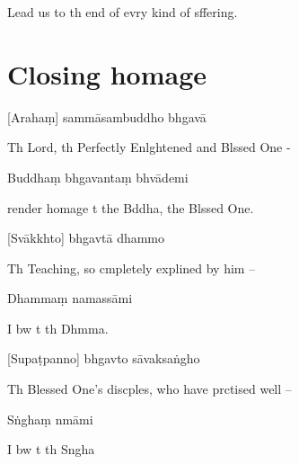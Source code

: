 \begin{english}
  Lead us to th end of evry kind of sffering.
\end{english}

\clearpage

\chapter{Closing homage}

[Arahaṃ] sammāsambuddho bhgavā

\begin{english}
  Th Lord, th Perfectly Enlghtened and Blssed One -
\end{english}

Buddhaṃ bhgavantaṃ bhvādemi

\begin{english}
   render homage t the Bddha, the Blssed One.
\end{english}

[Svākkhto] bhgavtā dhammo

\begin{english}
  Th Teaching, so cmpletely explined by him --
\end{english}

Dhammaṃ namassāmi

\begin{english}
  I bw t th Dhmma.
\end{english}


[Supaṭpanno] bhgavto sāvaksaṅgho

\begin{english}
  Th Blessed One's discples, who have prctised well --
\end{english}

Sṅghaṃ nmāmi

\begin{english}
  I bw t th Sngha
\end{english}
